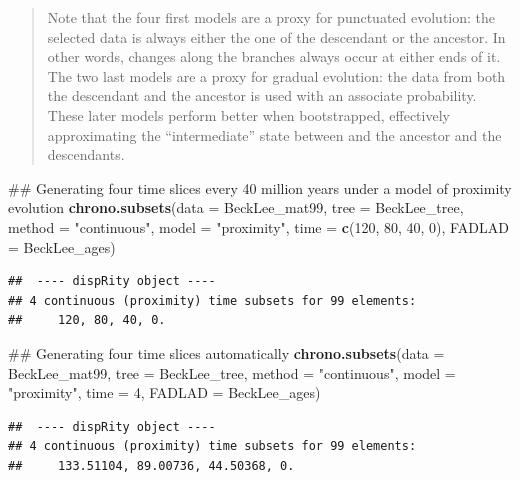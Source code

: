 \documentclass[]{book}
\newenvironment{Shaded}{\begin{snugshade}}{\end{snugshade}}
\newcommand{\KeywordTok}[1]{\textcolor[rgb]{0.13,0.29,0.53}{\textbf{#1}}}
\newcommand{\DataTypeTok}[1]{\textcolor[rgb]{0.13,0.29,0.53}{#1}}
\newcommand{\DecValTok}[1]{\textcolor[rgb]{0.00,0.00,0.81}{#1}}
\newcommand{\StringTok}[1]{\textcolor[rgb]{0.31,0.60,0.02}{#1}}
\newcommand{\NormalTok}[1]{#1}
\theoremstyle{definition}
\theoremstyle{definition}
\theoremstyle{remark}
\begin{document}
\begin{quote}
Note that the four first models are a proxy for punctuated evolution:
the selected data is always either the one of the descendant or the
ancestor. In other words, changes along the branches always occur at
either ends of it. The two last models are a proxy for gradual
evolution: the data from both the descendant and the ancestor is used
with an associate probability. These later models perform better when
bootstrapped, effectively approximating the ``intermediate'' state
between and the ancestor and the descendants.
\end{quote}

\begin{Shaded}
\begin{Highlighting}[]
\NormalTok{## Generating four time slices every 40 million years under a model of proximity evolution}
\KeywordTok{chrono.subsets}\NormalTok{(}\DataTypeTok{data =}\NormalTok{ BeckLee_mat99, }\DataTypeTok{tree =}\NormalTok{ BeckLee_tree, }
    \DataTypeTok{method =} \StringTok{"continuous"}\NormalTok{, }\DataTypeTok{model =} \StringTok{"proximity"}\NormalTok{, }\DataTypeTok{time =} \KeywordTok{c}\NormalTok{(}\DecValTok{120}\NormalTok{, }\DecValTok{80}\NormalTok{, }\DecValTok{40}\NormalTok{, }\DecValTok{0}\NormalTok{),}
    \DataTypeTok{FADLAD =}\NormalTok{ BeckLee_ages)}
\end{Highlighting}
\end{Shaded}

\begin{verbatim}
##  ---- dispRity object ---- 
## 4 continuous (proximity) time subsets for 99 elements:
##     120, 80, 40, 0.
\end{verbatim}

\begin{Shaded}
\begin{Highlighting}[]
\NormalTok{## Generating four time slices automatically}
\KeywordTok{chrono.subsets}\NormalTok{(}\DataTypeTok{data =}\NormalTok{ BeckLee_mat99, }\DataTypeTok{tree =}\NormalTok{ BeckLee_tree,}
    \DataTypeTok{method =} \StringTok{"continuous"}\NormalTok{, }\DataTypeTok{model =} \StringTok{"proximity"}\NormalTok{, }\DataTypeTok{time =} \DecValTok{4}\NormalTok{, }\DataTypeTok{FADLAD =}\NormalTok{ BeckLee_ages)}
\end{Highlighting}
\end{Shaded}

\begin{verbatim}
##  ---- dispRity object ---- 
## 4 continuous (proximity) time subsets for 99 elements:
##     133.51104, 89.00736, 44.50368, 0.
\end{verbatim}
\end{document}
